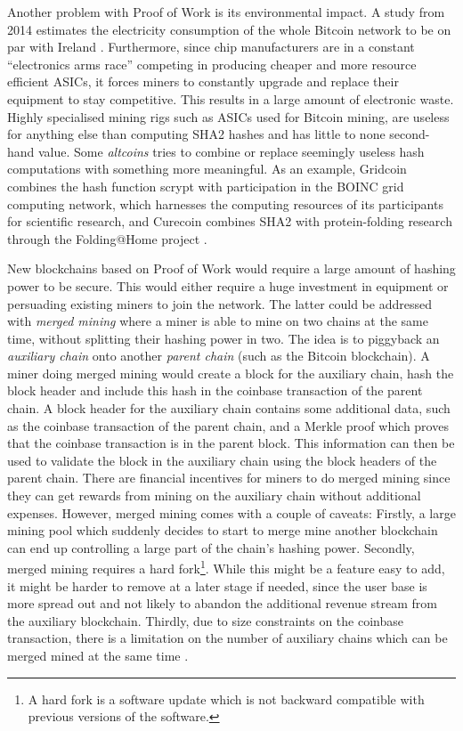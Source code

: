 \documentclass{style/kththesis}
\begin{document}
Another problem with Proof of Work is its environmental impact. A study from 2014 estimates the electricity consumption of the whole Bitcoin network to be on par with Ireland \cite{ODwyer14}. Furthermore, since chip manufacturers are in a constant ``electronics arms race'' competing in producing cheaper and more resource efficient ASICs, it forces miners to constantly upgrade and replace their equipment to stay competitive. This results in a large amount of electronic waste. Highly specialised mining rigs such as ASICs used for Bitcoin mining, are useless for anything else than computing SHA2 hashes and has little to none second-hand value. Some \textit{altcoins} tries to combine or replace seemingly useless hash computations with something more meaningful. As an example, Gridcoin combines the hash function scrypt with participation in the BOINC grid computing network, which harnesses the computing resources of its participants for scientific research, and Curecoin combines SHA2 with protein-folding research through the Folding@Home project \cite{Antonopoulos14}. 

New blockchains based on Proof of Work would require a large amount of hashing power to be secure. This would either require a huge investment in equipment or persuading existing miners to join the network. The latter could be addressed with \emph{merged mining} where a miner is able to mine on two chains at the same time, without splitting their hashing power in two. The idea is to piggyback an \emph{auxiliary chain} onto another \textit{parent chain} (such as the Bitcoin blockchain). A miner doing merged mining would create a block for the auxiliary chain, hash the block header and include this hash in the coinbase transaction of the parent chain. A block header for the auxiliary chain contains some additional data, such as the coinbase transaction of the parent chain, and a Merkle proof which proves that the coinbase transaction is in the parent block. This information can then be used to validate the block in the auxiliary chain using the block headers of the parent chain. There are financial incentives for miners to do merged mining since they can get rewards from mining on the auxiliary chain without additional expenses. However, merged mining comes with a couple of caveats: Firstly, a large mining pool which suddenly decides to start to merge mine another blockchain can end up controlling a large part of the chain's hashing power. Secondly, merged mining requires a hard fork\footnote{A hard fork is a software update which is not backward compatible with previous versions of the software.}. While this might be a feature easy to add, it might be harder to remove at a later stage if needed, since the user base is more spread out and not likely to abandon the additional revenue stream from the auxiliary blockchain. Thirdly, due to size constraints on the coinbase transaction, there is a limitation on the number of auxiliary chains which can be merged mined at the same time \cite{BitcoinWiki0220}.
\end{document}
